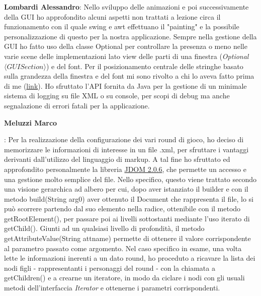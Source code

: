 \documentclass[a4paper,12pt, hidelinks]{report}
\begin{document}
	\item \textbf{Lombardi Alessandro}: Nello sviluppo delle animazioni e poi successivamente della GUI ho approfondito alcuni aspetti non trattati a lezione circa il funzionamento con il quale swing e awt effettuano il "painting" e la possibile personalizzazione di questo per la nostra applicazione. Sempre nella gestione della GUI ho fatto uso della classe Optional per controllare la presenza o meno nelle varie scene delle implementazioni lato view delle parti di una finestra (\emph{Optional$\langle GUISection \rangle$}) e del font. Per il posizionamento centrale delle stringhe basato sulla grandezza della finestra e del font mi sono rivolto a chi lo aveva fatto prima di me (\href{https://stackoverflow.com/questions/27706197/how-can-i-center-graphics-drawstring-in-java}{link}). Ho sfruttato l'API fornita da Java per la gestione di un minimale sistema di logging su file XML o su console, per scopi di debug ma anche segnalazione di errori  fatali per la applicazione.

	\hypertarget{target}{\item \textbf{Meluzzi Marco}}: Per la realizzazione della configurazione dei vari round di gioco, ho deciso di memorizzare le informazioni di interesse in un file .xml, per sfruttare i vantaggi derivanti dall'utilizzo del linguaggio di markup. A tal fine ho sfruttato ed approfondito personalmente la libreria \href{http://www.jdom.org}{JDOM 2.0.6}, che permette un accesso e una gestione molto semplice del file. Nello specifico, questo viene trattato secondo una visione gerarchica ad albero per cui, dopo aver istanziato il builder e con il metodo build(String arg0) aver ottenuto il Document che rappresenta il file, lo si può scorrere partendo dal suo elemento nella radice, ottenibile con il metodo getRootElement(), per passare poi ai livelli sottostanti mediante l'uso iterato di getChild(). Giunti ad un qualsiasi livello di profondità, il metodo getAttributeValue(String attname) permette di ottenere il valore corrispondente al parametro passato come argomento. Nel caso specifico in esame, una volta lette le informazioni inerenti a un dato round, ho proceduto a ricavare la lista dei nodi figli - rappresentanti i personaggi del round - con la chiamata a getChildren() e a crearne un iteratore, in modo da ciclare i nodi con gli usuali metodi dell'interfaccia \emph{Iterator} e ottenerne i parametri corrispondenti.
\end{document}
